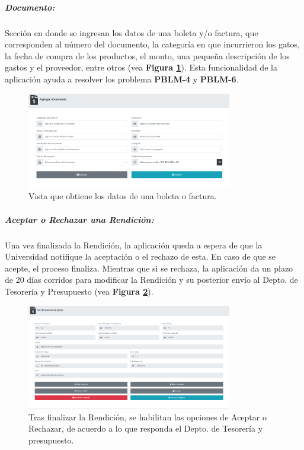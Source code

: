     
    \subparagraph{\emph{Documento: }} Sección en donde se ingresan los datos de una boleta y/o factura, que corresponden al número del documento, la categoría en que incurrieron los gatos, la fecha de compra de los productos, el monto, una pequeña descripción de los gastos y el proveedor, entre otros (vea \textbf{Figura \ref{fig: AgregarBoletas}}). Esta funcionalidad de la aplicación ayuda a resolver los problema \textbf{PBLM-4} y \textbf{PBLM-6}.

    \begin{figure}[htbp]
        \centering
        \includegraphics[width= 0.8\textwidth]{Imagenes/AgregarBoletas.PNG}
        \caption{\label{fig: AgregarBoletas}Vista que obtiene los datos de una boleta o factura.}
    \end{figure}

    \subparagraph{\emph{Aceptar o Rechazar una Rendición: }} Una vez finalizada la Rendición, la aplicación queda a espera de que la Universidad notifique la aceptación o el rechazo de esta. En caso de que se acepte, el proceso finaliza. Mientras que si se rechaza, la aplicación da un plazo de 20 días corridos para modificar la Rendición y su posterior envío al Depto. de Tesorería y Presupuesto (vea \textbf{Figura \ref{fig: AceptarRechazarDG}}).

    \begin{figure}[htbp]
        \centering
        \includegraphics[width= 0.8\textwidth]{Imagenes/AceptarRechazarDeclaracion.PNG}
        \caption{\label{fig: AceptarRechazarDG}Tras finalizar la Rendición, se habilitan las opciones de Aceptar o Rechazar, de acuerdo a lo que responda el Depto. de Tesorería y presupuesto.}
    \end{figure}



